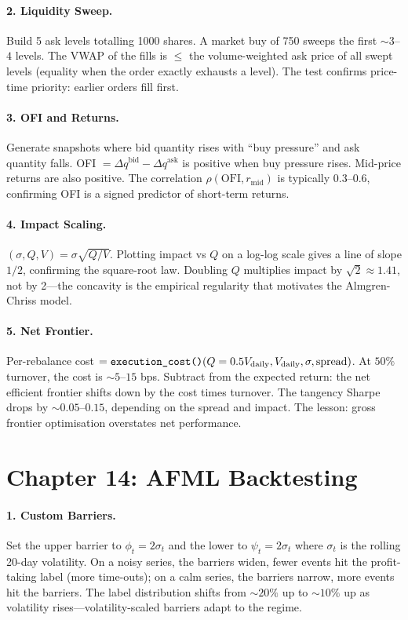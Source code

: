 \paragraph{2. Liquidity Sweep.}
Build 5 ask levels totalling 1000 shares. A market buy of 750
sweeps the first $\sim 3$--$4$ levels. The VWAP of the fills is
$\le$ the volume-weighted ask price of all swept levels (equality
when the order exactly exhausts a level). The test confirms
price-time priority: earlier orders fill first.

\paragraph{3. OFI and Returns.}
Generate snapshots where bid quantity rises with ``buy pressure''
and ask quantity falls. OFI $= \Delta q^{\text{bid}} - \Delta
q^{\text{ask}}$ is positive when buy pressure rises. Mid-price
returns are also positive. The correlation $\rho(\text{OFI},
r_{\text{mid}})$ is typically 0.3--0.6, confirming OFI is a
signed predictor of short-term returns.

\paragraph{4. Impact Scaling.}
$(\sigma, Q, V) = \sigma \sqrt{Q/V}$. Plotting
impact vs $Q$ on a log-log scale gives a line of slope $1/2$,
confirming the square-root law. Doubling $Q$ multiplies impact by
$\sqrt{2} \approx 1.41$, not by 2---the concavity is the empirical
regularity that motivates the Almgren-Chriss model.

\paragraph{5. Net Frontier.}
Per-rebalance cost $= \texttt{execution\_cost()}(Q = 0.5 V_{\text{daily}},
V_{\text{daily}}, \sigma, \text{spread})$. At $50\%$ turnover, the
cost is $\sim 5$--$15$ bps. Subtract from the expected return: the
net efficient frontier shifts down by the cost times turnover. The
tangency Sharpe drops by $\sim 0.05$--$0.15$, depending on the
spread and impact. The lesson: gross frontier optimisation
overstates net performance.

\section*{Chapter 14: AFML Backtesting}

\paragraph{1. Custom Barriers.}
Set the upper barrier to $\phi_t = 2 \sigma_t$ and the lower to
$\psi_t = 2 \sigma_t$ where $\sigma_t$ is the rolling 20-day
volatility. On a noisy series, the barriers widen, fewer events
hit the profit-taking label (more time-outs); on a calm series,
the barriers narrow, more events hit the barriers. The label
distribution shifts from $\sim 20\%$ up to $\sim 10\%$ up as
volatility rises---volatility-scaled barriers adapt to the regime.

